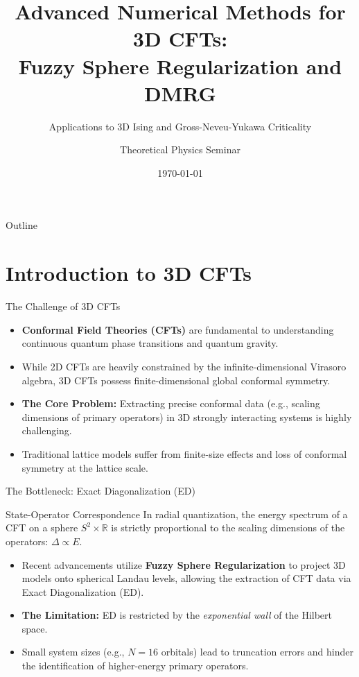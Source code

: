 \documentclass[aspectratio=169]{beamer}
\title[Fuzzy Sphere \& DMRG for 3D CFTs]{Advanced Numerical Methods for 3D CFTs: \\ Fuzzy Sphere Regularization and DMRG}
\subtitle{Applications to 3D Ising and Gross-Neveu-Yukawa Criticality}
\author{Theoretical Physics Seminar}
\date{\today}
\begin{document}
\begin{frame}
    \titlepage
\end{frame}

\begin{frame}{Outline}
    \tableofcontents
\end{frame}

\section{Introduction to 3D CFTs}
\begin{frame}{The Challenge of 3D CFTs}
    \begin{itemize}
        \item \textbf{Conformal Field Theories (CFTs)} are fundamental to understanding continuous quantum phase transitions and quantum gravity.
        \item While 2D CFTs are heavily constrained by the infinite-dimensional Virasoro algebra, 3D CFTs possess finite-dimensional global conformal symmetry.
        \item \textbf{The Core Problem:} Extracting precise conformal data (e.g., scaling dimensions of primary operators) in 3D strongly interacting systems is highly challenging.
        \item Traditional lattice models suffer from finite-size effects and loss of conformal symmetry at the lattice scale.
    \end{itemize}
\end{frame}

\begin{frame}{The Bottleneck: Exact Diagonalization (ED)}
    \begin{block}{State-Operator Correspondence}
        In radial quantization, the energy spectrum of a CFT on a sphere $S^2 \times \mathbb{R}$ is strictly proportional to the scaling dimensions of the operators: $\Delta \propto E$.
    \end{block}
    \vspace{0.5cm}
    \begin{itemize}
        \item Recent advancements utilize \textbf{Fuzzy Sphere Regularization} to project 3D models onto spherical Landau levels, allowing the extraction of CFT data via Exact Diagonalization (ED).
        \item \textbf{The Limitation:} ED is restricted by the \textit{exponential wall} of the Hilbert space. 
        \item Small system sizes (e.g., $N=16$ orbitals) lead to truncation errors and hinder the identification of higher-energy primary operators.
    \end{itemize}
\end{frame}
\end{document}
